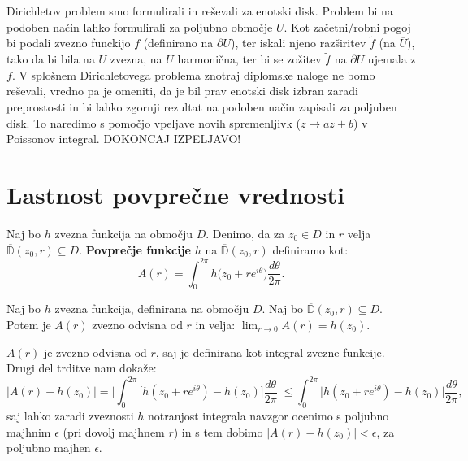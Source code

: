 \documentclass[mat1]{fmfdelo}
\begin{document}
    \begin{opomba}
        \label{alldisk}
        Dirichletov problem smo formulirali in reševali za enotski disk. Problem bi na podoben način lahko formulirali za poljubno območje $U$. 
        Kot začetni/robni pogoj bi podali zvezno funckijo $f$ (definirano na $\partial U$), ter iskali njeno razširitev $\widetilde{f}$ (na $\overline{U}$), tako da bi bila na $\overline{U}$ zvezna, 
        na $U$ harmonična, ter bi se zožitev $\widetilde{f}$ na $\partial U$ ujemala z $f$.
        V splošnem Dirichletovega problema znotraj diplomske naloge ne bomo reševali, vredno pa je omeniti, 
        da je bil prav enotski disk izbran zaradi preprostosti in bi lahko zgornji rezultat na podoben način zapisali za poljuben disk. To naredimo s pomočjo vpeljave novih spremenljivk ($z \mapsto az + b$) v Poissonov integral. 
        DOKONCAJ IZPELJAVO!
     \end{opomba}

\newpage
\section{Lastnost povprečne vrednosti}

    \begin{definicija}  
        Naj bo $h$ zvezna funkcija na območju $D$. Denimo, da za $z_0 \in D$ in $r$ velja  $\overline{\mathbb{D}}(z_0, r) \subseteq D$. \textbf{Povprečje funkcije} $h$ na $\overline{\mathbb{D}}(z_0, r)$ definiramo kot:
        $$
            A(r) = \int_{0}^{2 \pi}{h \big(z_0 + r e^{i\theta}\big)\frac{d\theta}{2 \pi}}.
        $$
    \end{definicija}
    \begin{trditev}
        \label{zvpov}
        Naj bo $h$ zvezna funkcija, definirana na območju $D$. Naj bo $\overline{\mathbb{D}}(z_0, r) \subseteq D$. 
        Potem je $A(r)$ zvezno odvisna od $r$ in velja: $\lim_{r \to 0}{A(r)} = h(z_0)$.
    \end{trditev}
    \begin{dokaz}
        $A(r)$ je zvezno odvisna od $r$, saj je definirana kot integral zvezne funkcije. Drugi del trditve nam dokaže:
        $$
            |A(r) - h(z_0)| = \bigg|\int_{0}^{2\pi} \big[h(z_0 + r e^{i\theta})  - h(z_0)\big] \frac{d\theta}{2\pi} \bigg| \leq \int_{0}^{2 \pi} \big| h(z_0 + r e^{i\theta}) - h(z_0) \big| \frac{d\theta}{2 \pi},
        $$
        saj lahko zaradi zveznosti $h$ notranjost integrala navzgor ocenimo s poljubno majhnim $\epsilon$ (pri dovolj majhnem $r$) in s tem dobimo $|A(r) - h(z_0)| < \epsilon$, za poljubno majhen $\epsilon$. 
    \end{dokaz}
\end{document}
